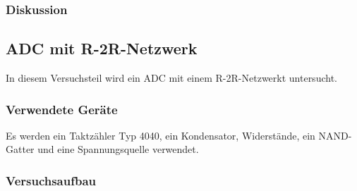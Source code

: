 \documentclass[12pt,a4paper]{article}
\begin{document}
\subsubsection*{Diskussion}





\subsection{ADC mit R-2R-Netzwerk}

In diesem Versuchsteil wird ein ADC mit einem R-2R-Netzwerkt untersucht.

\subsubsection*{Verwendete Geräte}

Es werden ein Taktzähler Typ 4040, ein Kondensator, Widerstände, ein NAND-Gatter und eine Spannungsquelle verwendet.

\subsubsection*{Versuchsaufbau}
\end{document}
